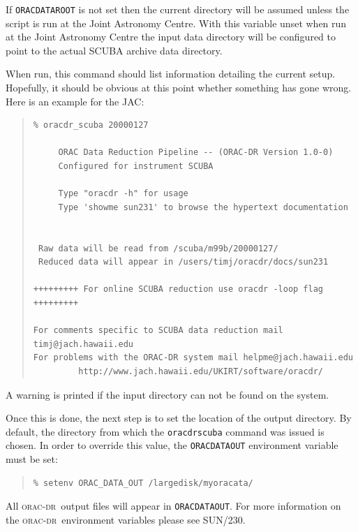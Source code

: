 \documentclass[twoside,11pt]{article}
\newcommand{\xref}[3]{#1}
\renewcommand{\_}{\texttt{\symbol{95}}}
\newcommand{\oracdr}{\xref{\textsc{orac-dr}}{sun230}{}}
\newenvironment{myquote}{\begin{quote}\begin{small}}{\end{small}\end{quote}}
\begin{document}
If \texttt{ORAC\_DATA\_ROOT} is not set then the current directory
will be assumed unless the script is run at the Joint Astronomy Centre.
With this variable unset when run at the Joint Astronomy Centre
the input data directory will be configured to point to the actual
SCUBA archive data directory.

When run, this command should list information detailing the
current setup. Hopefully, it should be obvious at this point
whether something has gone wrong. Here is an example for the JAC:

\begin{myquote}
\begin{verbatim}
% oracdr_scuba 20000127
 
     ORAC Data Reduction Pipeline -- (ORAC-DR Version 1.0-0)
     Configured for instrument SCUBA
 
     Type "oracdr -h" for usage
     Type 'showme sun231' to browse the hypertext documentation
 
 
 Raw data will be read from /scuba/m99b/20000127/
 Reduced data will appear in /users/timj/oracdr/docs/sun231
 
+++++++++ For online SCUBA reduction use oracdr -loop flag +++++++++

For comments specific to SCUBA data reduction mail timj@jach.hawaii.edu
For problems with the ORAC-DR system mail helpme@jach.hawaii.edu
         http://www.jach.hawaii.edu/UKIRT/software/oracdr/

\end{verbatim}
\end{myquote}

A warning is printed if the input directory can not be found
on the system.

Once this is done, the next step is to set the location of the
output directory. By default, the directory from which the
\texttt{oracdr\_scuba} command was issued is chosen. In order
to override this value, the \texttt{ORAC\_DATA\_OUT} environment
variable must be set:

\begin{myquote}
\begin{verbatim}
% setenv ORAC_DATA_OUT /largedisk/myoracata/
\end{verbatim}
\end{myquote}

All \oracdr\ output files will appear in \texttt{ORAC\_DATA\_OUT}.
For more information on the \oracdr\ environment variables please
see \xref{SUN/230}{sun230}{shell_variables}.
\end{document}
